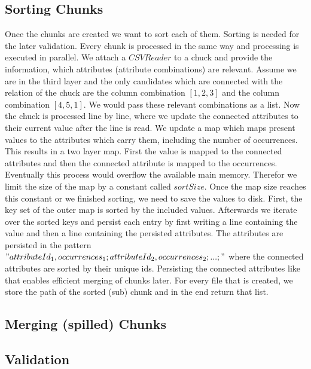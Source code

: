 \subsection{Sorting Chunks}
Once the chunks are created we want to sort each of them. Sorting is needed for the later validation. Every chunk is processed in the same way and processing is executed in parallel. We attach a $CSVReader$ to a chuck and provide the information, which attributes (attribute combinations) are relevant. Assume we are in the third layer and the only candidates which are connected with the relation of the chuck are the column combination $[1, 2, 3]$ and the column combination $[4, 5, 1]$. We would pass these relevant combinations as a list. Now the chuck is processed line by line, where we update the connected attributes to their current value after the line is read. We update a map which maps present values to the attributes which carry them, including the number of occurrences. This results in a two layer map. First the value is mapped to the connected attributes and then the connected attribute is mapped to the occurrences. Eventually this process would overflow the available main memory. Therefor we limit the size of the map by a constant called $sortSize$. Once the map size reaches this constant or we finished sorting, we need to save the values to disk. First, the key set of the outer map is sorted by the included values. Afterwards we iterate over the sorted keys and persist each entry by first writing a line containing the value and then a line containing the persisted attributes. The attributes are persisted in the pattern $"attributeId_1,occurrences_1;attributeId_2,occurrences_2;...;"$ where the connected attributes are sorted by their unique ids. Persisting the connected attributes like that enables efficient merging of chunks later. For every file that is created, we store the path of the sorted (sub) chunk and in the end return that list.

\subsection{Merging (spilled) Chunks}

\subsection{Validation}